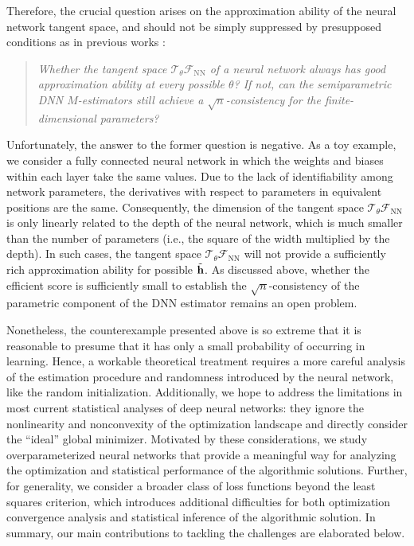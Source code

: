 Therefore, the crucial question arises on the approximation ability of the neural network tangent space, and should not be simply suppressed by presupposed conditions as in previous works \citep{deepcox,chen2024causal}:
\begin{quote}
\normalsize
\emph{Whether the tangent space $\mathcal{T}_{\theta} \mathcal{F}_{\text{NN}}$ of a neural network always has good approximation ability at every possible $\theta$? If not, can the semiparametric DNN $M$-estimators still achieve a $\sqrt{n}$-consistency for the finite-dimensional parameters? }
\end{quote}
Unfortunately, the answer to the former question is negative. 
As a toy example, we consider a fully connected neural network in which the weights and biases within each layer take the same values.
Due to the lack of identifiability among network parameters, the derivatives with respect to parameters in equivalent positions are the same. 
Consequently, the dimension of the tangent space $\mathcal{T}_{\theta}\mathcal{F}_{\text{NN}}$ is only linearly related to the depth of the neural network, which is much smaller than the number of parameters (i.e., the square of the width multiplied by the depth).
In such cases, the tangent space $\mathcal{T}_{\theta}\mathcal{F}_{\text{NN}}$ will not provide a sufficiently rich approximation ability for possible $\tilde{\mathbf{h}}$. 
As discussed above, whether the efficient score is sufficiently small to establish the $\sqrt{n}$-consistency of the parametric component of the DNN estimator remains an open problem. 




Nonetheless, the counterexample presented above is so extreme that it is reasonable to presume that it has only a small probability of occurring in learning. Hence, a workable theoretical treatment requires a more careful analysis of the estimation procedure and randomness introduced by the neural network, like the random initialization. 
Additionally, we hope to address the limitations in most current statistical analyses of deep neural networks: they ignore the nonlinearity and nonconvexity of the optimization landscape and directly consider the ``ideal'' global minimizer. 
Motivated by these considerations, we study overparameterized neural networks that provide a meaningful way for analyzing the optimization and statistical performance of the algorithmic solutions. 
Further, for generality, we consider a broader class of loss functions beyond the least squares criterion, which introduces additional difficulties for both optimization convergence analysis and statistical inference of the algorithmic solution. 
In summary, our main contributions to tackling the challenges are elaborated below.

